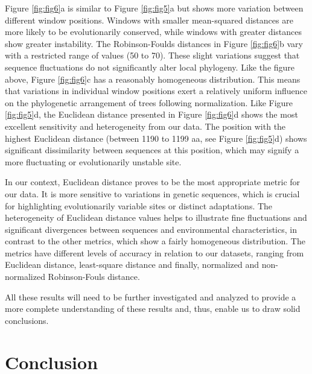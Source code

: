 Figure \ref{fig:fig6}a is similar to Figure \ref{fig:fig5}a but shows more variation between different window positions. Windows with smaller mean-squared distances are more likely to be evolutionarily conserved, while windows with greater distances show greater instability. The Robinson-Foulds distances in Figure \ref{fig:fig6}b vary with a restricted range of values (50 to 70). These slight variations suggest that sequence fluctuations do not significantly alter local phylogeny. Like the figure above, Figure \ref{fig:fig6}c has a reasonably homogeneous distribution. This means that variations in individual window positions exert a relatively uniform influence on the phylogenetic arrangement of trees following normalization. Like Figure \ref{fig:fig5}d, the Euclidean distance presented in Figure \ref{fig:fig6}d shows the most excellent sensitivity and heterogeneity from our data. The position with the highest Euclidean distance (between 1190 to  1199 aa, see Figure \ref{fig:fig5}d) shows significant dissimilarity between sequences at this position, which may signify a more fluctuating or evolutionarily unstable site. 

In our context, Euclidean distance proves to be the most appropriate metric for our data. It is more sensitive to variations in genetic sequences, which is crucial for highlighting evolutionarily variable sites or distinct adaptations. The heterogeneity of Euclidean distance values helps to illustrate fine fluctuations and significant divergences between sequences and environmental characteristics, in contrast to the other metrics, which show a fairly homogeneous distribution. The metrics have different levels of accuracy in relation to our datasets, ranging from Euclidean distance, least-square distance and finally, normalized and non-normalized Robinson-Fouls distance. 

All these results will need to be further investigated and analyzed to provide a more complete understanding of these results and, thus, enable us to draw solid conclusions.

\section{Conclusion}\label{conclusion}

